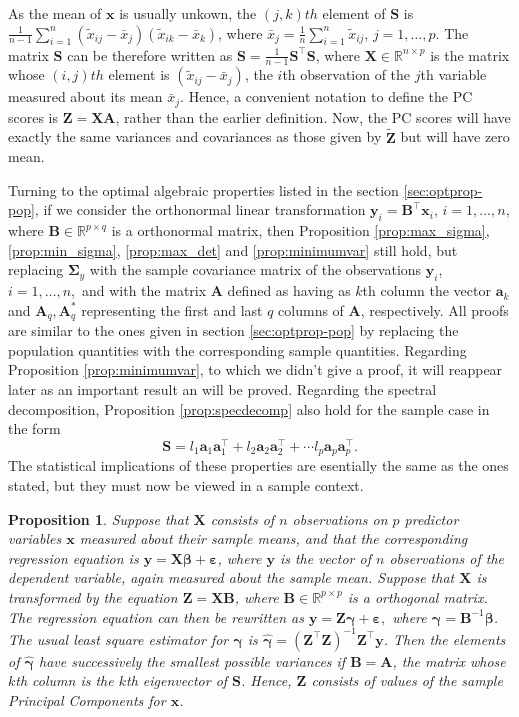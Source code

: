 \documentclass[11pt, oneside]{book}
\theoremstyle{plain}
\newtheorem{prop}{Proposition}[section]
\theoremstyle{remark}
\newcommand*{\mbf}[1]{\mathbf{#1}}
\begin{document}
As the mean of $\mbf{x}$ is usually unkown, the $(j,k)th$ element of $\mbf{S}$
is
$\frac{1}{n-1}\sum_{i=1}^n(\tilde{x}_{ij}-\bar{x}_j)(\tilde{x}_{ik}-\bar{x}_k)$,
where $\bar{x}_j = \frac{1}{n}\sum_{i=1}^n\tilde{x}_{ij}$, $j=1,\dots,p$. The
matrix $\mbf{S}$ can be therefore written as $\mbf{S} =
\frac{1}{n-1}\mbf{S}^\top\mbf{S}$, where $\mbf{X}\in\mathbb{R}^{n\times p}$ is
the matrix whose $(i,j)th$ element is $(\tilde{x}_{ij}-\bar{x}_j)$, the $i$th
observation of the $j$th variable measured about its mean $\bar{x}_j$. Hence, a
convenient notation to define the PC scores is $\mbf{Z} = \mbf{XA}$, rather than
the earlier definition. Now, the PC scores will have exactly the same variances
and covariances as those given by $\tilde{\mbf{Z}}$ but will have zero mean.

Turning to the optimal algebraic properties listed in the section
\ref{sec:optprop-pop}, if we consider the orthonormal linear
transformation $\mbf{y}_i = \mbf{B}^\top\mbf{x}_i$, $i=1,\dots,n$, where
$\mbf{B}\in\mathbb{R}^{p\times q}$ is a orthonormal matrix, then Proposition
\ref{prop:max_sigma}, \ref{prop:min_sigma}, \ref{prop:max_det} and
\ref{prop:minimumvar} still hold, but replacing $\mbf{\Sigma}_y$ with the sample
covariance matrix of the observations $\mbf{y}_i$, $i=1,\dots,n,$ and with the
matrix $\mbf{A}$ defined as having as $k$th column the vector $\mbf{a}_k$ and
$\mbf{A}_q, \mbf{A}_q^*$ representing the first and last $q$ columns of
$\mbf{A}$, respectively. All proofs are similar to the ones given in section
\ref{sec:optprop-pop} by replacing the population quantities with the
corresponding sample quantities. Regarding Proposition \ref{prop:minimumvar}, to
which we didn't give a proof, it will reappear later as an important result an
will be proved.  Regarding the spectral decomposition, Proposition
\ref{prop:specdecomp} also hold for the sample case in the form $$\mbf{S} =
l_1\mbf{a}_1\mbf{a}_1^\top + l_2\mbf{a}_2\mbf{a}_2^\top + \cdots
l_p\mbf{a}_p\mbf{a}_p^\top.$$ The statistical implications of these properties
are esentially the same as the ones stated, but they must now be viewed in a
sample context.
\begin{prop} 
Suppose that $\mbf{X}$ consists of $n$ observations on $p$ predictor variables
$\mbf{x}$ measured about their sample means, and that the corresponding
regression equation is $\mbf{y} = \mbf{X}\bm{\beta} + \bm{\varepsilon}$, where
$\mbf{y}$ is the vector of $n$ observations of the dependent variable, again
measured about the sample mean. Suppose that $\mbf{X}$ is transformed by the
equation $\mbf{Z} = \mbf{XB}$, where $\mbf{B}\in\mathbb{R}^{p\times p}$ is a
orthogonal matrix. The regression equation can then be rewritten as $\mbf{y} =
\mbf{Z}\bm{\gamma} + \bm{\varepsilon},$ where $\bm{\gamma} =
\mbf{B}^{-1}\bm{\beta}$. The usual least square estimator for $\bm{\gamma}$ is
$\hat{\bm{\gamma}} = (\mbf{Z}^\top\mbf{Z})^{-1}\mbf{Z}^\top\mbf{y}$. Then the
elements of $\hat{\bm{\gamma}}$ have successively the smallest possible
variances if $\mbf{B} = \mbf{A}$, the matrix whose $k$th column is the $k$th
eigenvector of $\mbf{S}$. Hence, $\mbf{Z}$ consists of values of the sample
Principal Components for $\mbf{x}$. 
\end{prop}
\end{document}
